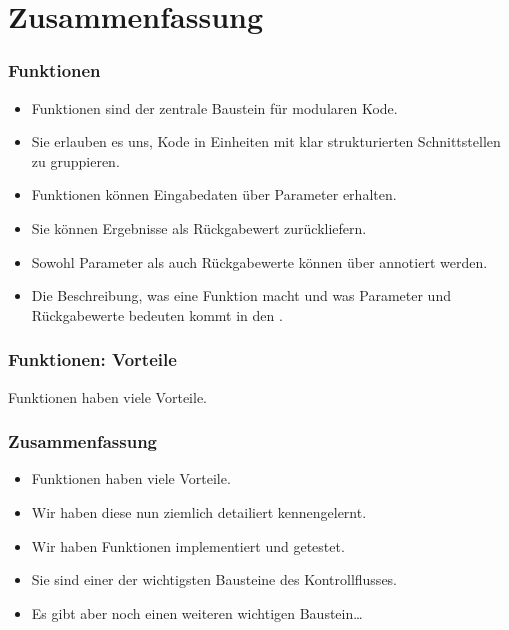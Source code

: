 \documentclass[aspectratio=169,mathserif,notheorems]{beamer}%
\begin{document}
\section{Zusammenfassung}%
%
\begin{frame}%
\frametitle{Funktionen}%
\begin{itemize}%
%
\item Funktionen sind der zentrale Baustein für modularen Kode.%
%
\item<2-> Sie erlauben es uns, Kode in Einheiten mit klar strukturierten Schnittstellen zu gruppieren.%
%
\item<3-> Funktionen können Eingabedaten über Parameter erhalten.%
%
\item<4-> Sie können Ergebnisse als Rückgabewert zurückliefern.%
%
\item<5-> Sowohl Parameter als auch Rückgabewerte können über  annotiert werden.%
%
\item<6-> Die Beschreibung, was eine Funktion macht und was Parameter und Rückgabewerte bedeuten kommt in den .%
\end{itemize}%
\end{frame}%
%
\begin{frame}%
\frametitle{Funktionen: Vorteile}%
Funktionen haben viele Vorteile.%
%
\end{frame}%
%
\begin{frame}%
\frametitle{Zusammenfassung}%
\begin{itemize}%
%
\item Funktionen haben viele Vorteile.%
%
\item<2-> Wir haben diese nun ziemlich detailiert kennengelernt.%
%
\item<3-> Wir haben Funktionen implementiert und getestet.%
%
\item<4-> Sie sind einer der wichtigsten Bausteine des Kontrollflusses.%
%
\item<5-> Es gibt aber noch einen weiteren wichtigen Baustein\dots%
%
\end{itemize}%
\end{frame}%
%
\endPresentation%
\end{document}
